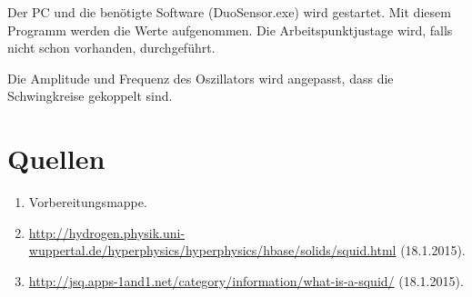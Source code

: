 \documentclass[a4paper,ngerman]{scrartcl}
\begin{document}
Der PC und die benötigte Software (DuoSensor.exe) wird gestartet.
Mit diesem Programm werden die Werte aufgenommen.
Die Arbeitspunktjustage wird, falls nicht schon vorhanden, durchgeführt.

Die Amplitude und Frequenz des Oszillators wird angepasst, dass die Schwingkreise gekoppelt sind.





\section{Quellen}
\begin{enumerate}
\item Vorbereitungsmappe.\label{ref:mappe}
\item \url{http://hydrogen.physik.uni-wuppertal.de/hyperphysics/hyperphysics/hbase/solids/squid.html} (18.1.2015).\label{ref:wuppertal}
\item \url{http://jsq.apps-1and1.net/category/information/what-is-a-squid/} (18.1.2015).
\label{ref:jsq}
\end{enumerate}
\end{document}
